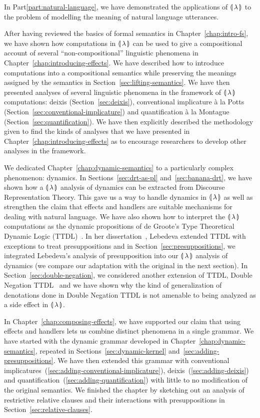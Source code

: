 In Part\ref{part:natural-language}, we have demonstrated the applications
of ${\llparenthesis \, \lambda \, \rrparenthesis}$ to the problem of modelling the meaning of natural language
utterances.

After having reviewed the basics of formal semantics in
Chapter~\ref{chap:intro-fs}, we have shown how computations in ${\llparenthesis \, \lambda \, \rrparenthesis}$ can
be used to give a compositional account of several ``non-compositional''
linguistic phenomena in Chapter~\ref{chap:introducing-effects}. We have
described how to introduce computations into a compositional semantics
while preserving the meanings assigned by the semantics in
Section~\ref{sec:lifting-semantics}. We have then presented analyses of
several linguistic phenomena in the framework of ${\llparenthesis \, \lambda \, \rrparenthesis}$ computations:
deixis (Section~\ref{sec:deixis}), conventional implicature à la Potts
(Section~\ref{sec:conventional-implicature}) and quantification à la
Montague (Section~\ref{sec:quantification}). We have then explicitly
described the methodology given to find the kinds of analyses that we have
presented in Chapter~\ref{chap:introducing-effects} as to encourage
researchers to develop other analyses in the framework.

We dedicated Chapter~\ref{chap:dynamic-semantics} to a particularly complex
phenomenon: dynamics. In Sections~\ref{sec:drt-as-pl}
and~\ref{sec:banana-drt}, we have shown how a ${\llparenthesis \, \lambda \, \rrparenthesis}$ analysis of dynamics
can be extracted from Discourse Representation Theory. This gave us a way
to handle dynamics in ${\llparenthesis \, \lambda \, \rrparenthesis}$ as well as strengthen the claim that effects
and handlers are suitable mechanisms for dealing with natural language. We
have also shown how to interpret the ${\llparenthesis \, \lambda \, \rrparenthesis}$ computations as the dynamic
propositions of de Groote's Type Theoretical Dynamic Logic
(TTDL)~\cite{de2006towards}. In her
dissertation~\cite{lebedeva2012expression}, Lebedeva extended TTDL with
exceptions to treat presuppositions and in
Section~\ref{sec:presuppositions}, we integrated Lebedeva's analysis of
presupposition into our ${\llparenthesis \, \lambda \, \rrparenthesis}$ analysis of dynamics (we compare our
adaptation with the original in the next section). In
Section~\ref{sec:double-negation}, we considered another extension of TTDL,
Double Negation TTDL~\cite{qian2014accessibility} and we have shown why the
kind of generalization of denotations done in Double Negation TTDL is not
amenable to being analyzed as a side effect in ${\llparenthesis \, \lambda \, \rrparenthesis}$.

In Chapter~\ref{chap:composing-effects}, we have supported our claim that
using effects and handlers lets us combine distinct phenomena in a single
grammar. We have started with the dynamic grammar developed in
Chapter~\ref{chap:dynamic-semantics}, repeated in
Sections~\ref{sec:dynamic-kernel} and~\ref{sec:adding-presuppositions}. We
have then extended this grammar with conventional
implicatures~(\ref{sec:adding-conventional-implicature}),
deixis~(\ref{sec:adding-deixis}) and
quantification~(\ref{sec:adding-quantification}) with little to no
modification of the original semantics. We finished the chapter by
sketching out an analysis of restrictive relative clauses and their
interactions with presuppositions in Section~\ref{sec:relative-clauses}.


